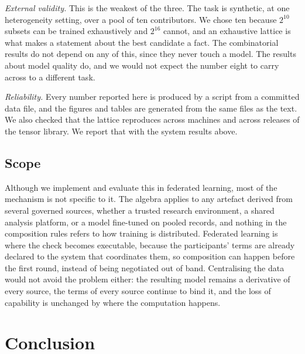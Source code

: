 \documentclass[10pt,conference]{IEEEtran}
\begin{document}
\emph{External validity.} This is the weakest of the three. The task is
synthetic, at one heterogeneity setting, over a pool of ten contributors. We
chose ten because $2^{10}$ subsets can be trained exhaustively and $2^{16}$
cannot, and an exhaustive lattice is what makes a statement about the best
candidate a fact. The combinatorial results do not depend on any of this, since
they never touch a model. The results about model quality do, and we would not
expect the number eight to carry across to a different task.

\emph{Reliability.} Every number reported here is produced by a script from a
committed data file, and the figures and tables are generated from the same
files as the text. We also checked that the lattice reproduces across machines
and across releases of the tensor library. We report that with the system results above.

\subsection{Scope}

Although we implement and evaluate this in federated learning, most of the
mechanism is not specific to it. The algebra applies to any artefact derived
from several governed sources, whether a trusted research environment, a shared
analysis platform, or a model fine-tuned on pooled records, and nothing in the
composition rules refers to how training is distributed. Federated learning is
where the check becomes executable, because the participants' terms are already
declared to the system that coordinates them, so composition can happen before the first round, instead of being negotiated out of band. Centralising the data
would not avoid the problem either: the resulting model remains a derivative of
every source, the terms of every source continue to bind it, and the loss of
capability is unchanged by where the computation happens.

\section{Conclusion}
\label{sec:conclusion}
\end{document}
